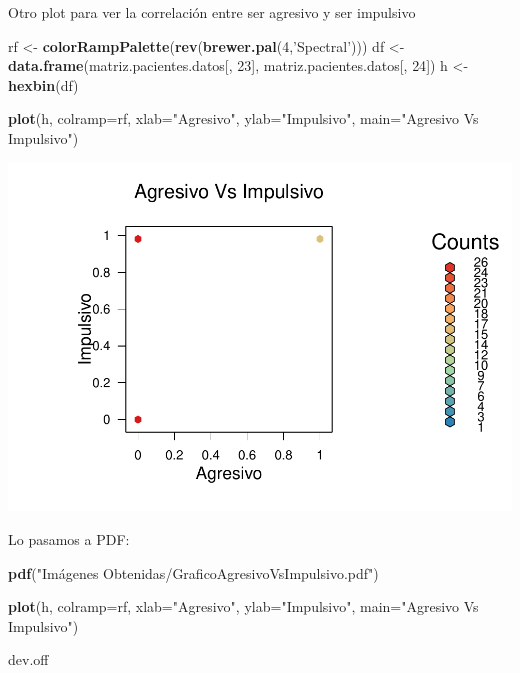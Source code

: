 \documentclass[]{article}
\newenvironment{Shaded}{\begin{snugshade}}{\end{snugshade}}
\newcommand{\DataTypeTok}[1]{\textcolor[rgb]{0.13,0.29,0.53}{#1}}
\newcommand{\DecValTok}[1]{\textcolor[rgb]{0.00,0.00,0.81}{#1}}
\newcommand{\KeywordTok}[1]{\textcolor[rgb]{0.13,0.29,0.53}{\textbf{#1}}}
\newcommand{\NormalTok}[1]{#1}
\newcommand{\StringTok}[1]{\textcolor[rgb]{0.31,0.60,0.02}{#1}}
\begin{document}
Otro plot para ver la correlación entre ser agresivo y ser impulsivo

\begin{Shaded}
\begin{Highlighting}[]
\NormalTok{rf <-}\StringTok{ }\KeywordTok{colorRampPalette}\NormalTok{(}\KeywordTok{rev}\NormalTok{(}\KeywordTok{brewer.pal}\NormalTok{(}\DecValTok{4}\NormalTok{,}\StringTok{'Spectral'}\NormalTok{)))}
\NormalTok{df <-}\StringTok{ }\KeywordTok{data.frame}\NormalTok{(matriz.pacientes.datos[, }\DecValTok{23}\NormalTok{], matriz.pacientes.datos[, }\DecValTok{24}\NormalTok{])}
\NormalTok{h <-}\StringTok{ }\KeywordTok{hexbin}\NormalTok{(df)}

\KeywordTok{plot}\NormalTok{(h, }\DataTypeTok{colramp=}\NormalTok{rf, }\DataTypeTok{xlab=}\StringTok{"Agresivo"}\NormalTok{, }\DataTypeTok{ylab=}\StringTok{"Impulsivo"}\NormalTok{, }\DataTypeTok{main=}\StringTok{"Agresivo Vs Impulsivo"}\NormalTok{)}
\end{Highlighting}
\end{Shaded}

\includegraphics{codigo_files/figure-latex/grafico_agresivo_impulsivo-1.pdf}

Lo pasamos a PDF:

\begin{Shaded}
\begin{Highlighting}[]
\KeywordTok{pdf}\NormalTok{(}\StringTok{"Imágenes Obtenidas/GraficoAgresivoVsImpulsivo.pdf"}\NormalTok{)}

\KeywordTok{plot}\NormalTok{(h, }\DataTypeTok{colramp=}\NormalTok{rf, }\DataTypeTok{xlab=}\StringTok{"Agresivo"}\NormalTok{, }\DataTypeTok{ylab=}\StringTok{"Impulsivo"}\NormalTok{, }\DataTypeTok{main=}\StringTok{"Agresivo Vs Impulsivo"}\NormalTok{)}

\NormalTok{dev.off}
\end{Highlighting}
\end{Shaded}
\end{document}
